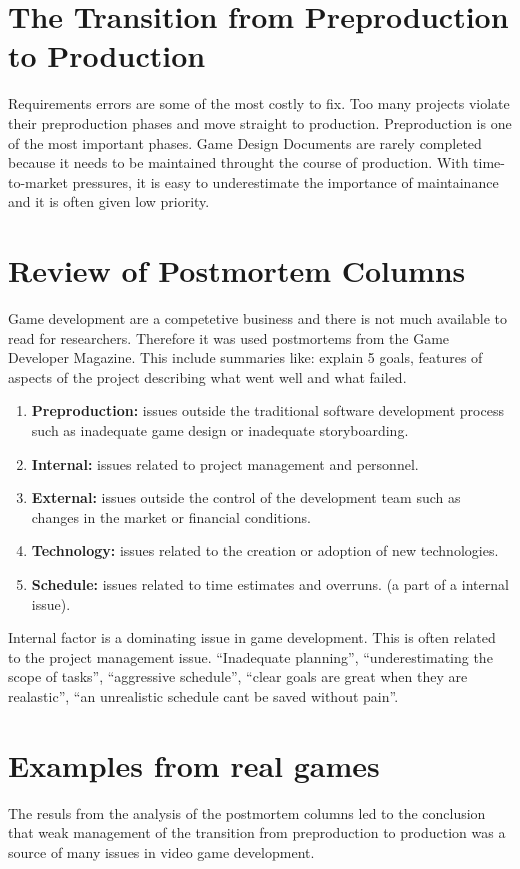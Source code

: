   \section*{The Transition from Preproduction to Production}
  Requirements errors are some of the most costly to fix. Too many projects violate their preproduction phases and move straight to production. Preproduction is one of the most important phases. Game Design Documents are rarely completed because it needs to be maintained throught the course of production. With time-to-market pressures, it is easy to underestimate the importance of maintainance and it is often given low priority. 

  \section*{Review of Postmortem Columns}
  Game development are a competetive business and there is not much available to read for researchers. Therefore it was used postmortems from the Game Developer Magazine. This include summaries like: explain 5 goals, features of aspects of the project describing what went well and what failed. 

    \begin{enumerate}
      \item {\bf Preproduction:} issues outside the traditional software development process such as inadequate game design or inadequate storyboarding.
      \item{\bf Internal:} issues related to project management and personnel.
      \item {\bf External:} issues outside the control of the development team such as changes in the market or financial conditions.
      \item {\bf Technology:} issues related to the creation or adoption of new technologies. 
      \item {\bf Schedule:} issues related to time estimates and overruns. (a part of a internal issue).
    \end{enumerate}

  Internal factor is a dominating issue in game development. This is often related to the project management issue. ``Inadequate planning'', ``underestimating the scope of tasks'', ``aggressive schedule'', ``clear goals are great when they are realastic'', ``an unrealistic schedule cant be saved without pain''.

  \section*{Examples from real games}
  The resuls from the analysis of the postmortem columns led to the conclusion that weak management of the transition from preproduction to production was a source of many issues in video game development.

